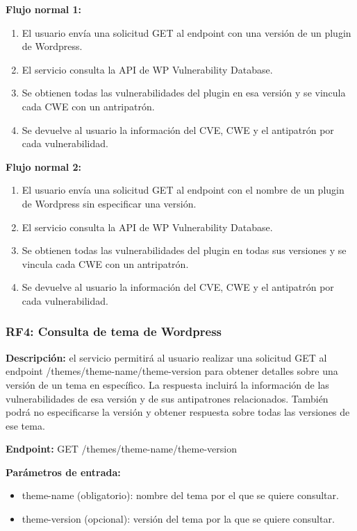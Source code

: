 \textbf{Flujo normal 1:}

\begin{enumerate}
    \item El usuario envía una solicitud GET al endpoint con una versión de un plugin de Wordpress.
    \item El servicio consulta la API de WP Vulnerability Database.
    \item Se obtienen todas las vulnerabilidades del plugin en esa versión y se vincula cada CWE con un antripatrón.
    \item Se devuelve al usuario la información del CVE, CWE y el antipatrón por cada vulnerabilidad.
\end{enumerate}

\textbf{Flujo normal 2:}

\begin{enumerate}
    \item El usuario envía una solicitud GET al endpoint con el nombre de un plugin de Wordpress sin especificar una versión.
    \item El servicio consulta la API de WP Vulnerability Database.
    \item Se obtienen todas las vulnerabilidades del plugin en todas sus versiones y se vincula cada CWE con un antripatrón.
    \item Se devuelve al usuario la información del CVE, CWE y el antipatrón por cada vulnerabilidad.
\end{enumerate}

\subsubsection{RF4: Consulta de tema de Wordpress}

\textbf{Descripción:} el servicio permitirá al usuario realizar una solicitud GET al endpoint /themes/{theme-name}/{theme-version} para obtener detalles sobre una versión de un tema en específico. La respuesta incluirá la información de las vulnerabilidades de esa versión y de sus antipatrones relacionados.  También podrá no especificarse la versión y obtener respuesta sobre todas las versiones de ese tema.

\textbf{Endpoint:} GET /themes/{theme-name}/{theme-version}

\textbf{Parámetros de entrada: }

\begin{itemize}
    \item theme-name (obligatorio): nombre del tema por el que se quiere consultar.
    \item theme-version (opcional): versión del tema por la que se quiere consultar.
\end{itemize}

